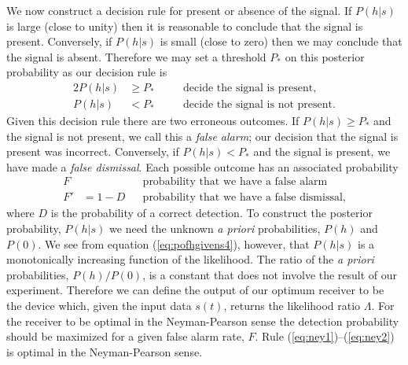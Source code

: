 We now construct a decision rule for present or absence of the signal.  If
$P(h|s)$ is large (close to unity) then it is reasonable to conclude that the
signal is present.  Conversely, if $P(h|s)$ is small (close to zero) then we
may conclude that the signal is absent.  Therefore we may set a threshold
$P_\ast$ on this posterior probability as our decision rule is
\begin{alignat}{2}
P(h|s) &\ge P_* &\quad&\text{decide the signal is present}, \label{eq:ney1} \\
P(h|s) &< P_* &&\text{decide the signal is not present}.\label{eq:ney2} 
\end{alignat}
Given this decision rule there are two erroneous outcomes.  If $P(h|s)
\ge P_*$ and the signal is not present, we call this a \emph{false alarm}; our
decision that the signal is present was incorrect. Conversely, if
$P(h|s) < P_*$ and the signal is present, we have made a \emph{false
dismissal}. Each possible outcome has an associated probability
\begin{align}
F  &&&\text{probability that we have a false alarm} \\
F' &= 1 - D &&\text{probability that we have a false dismissal},
\end{align}
where $D$ is the probability of a correct detection.
To construct the posterior probability, $P(h|s)$ we need
the unknown \emph{a priori} probabilities, $P(h)$ and $P(0)$. We see from
equation (\ref{eq:pofhgivens4}), however, that $P(h|s)$ is a monotonically
increasing function of the likelihood. The ratio of the \emph{a priori}
probabilities, $P(h)/P(0)$, is a constant that does not involve the result of
our experiment. Therefore we can define the output of our optimum receiver to be
the device which, given the input data $s(t)$, returns the likelihood ratio
$\Lambda$.  For the receiver to be optimal in the Neyman-Pearson sense the
detection probability should be maximized for a given false alarm rate, $F$.
Rule (\ref{eq:ney1})--(\ref{eq:ney2}) is optimal in the Neyman-Pearson sense.

